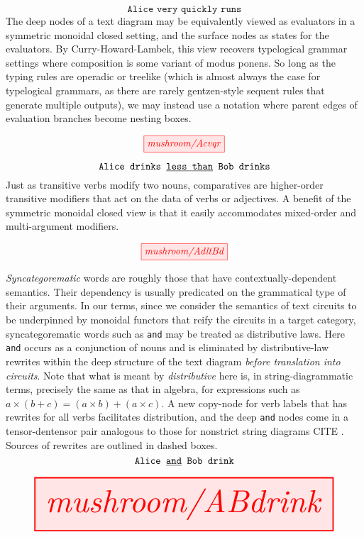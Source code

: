 \begin{myboxB}
\begin{example}\label{ex:intensifiers}
\[\texttt{Alice very quickly runs}\]
The deep nodes of a text diagram may be equivalently viewed as evaluators in a symmetric monoidal closed setting, and the surface nodes as states for the evaluators. By Curry-Howard-Lambek, this view recovers typelogical grammar settings where composition is some variant of modus ponens. So long as the typing rules are operadic or treelike (which is almost always the case for typelogical grammars, as there are rarely gentzen-style sequent rules that generate multiple outputs), we may instead use a notation where parent edges of evaluation branches become nesting boxes.
\end{example}
\[\tikzfig{mushroom/Acvqr}\]
\end{myboxB}

\begin{myboxB}
\begin{example}\label{ex:comparatives}
\[\texttt{Alice drinks \underline{less than} Bob drinks}\]
Just as transitive verbs modify two nouns, comparatives are higher-order transitive modifiers that act on the data of verbs or adjectives. A benefit of the symmetric monoidal closed view is that it easily accommodates mixed-order and multi-argument modifiers.
\end{example}
\[\tikzfig{mushroom/AdltBd}\]
\end{myboxB}

\begin{myboxR}
\begin{example}\label{ex:syncat1}
\emph{Syncategorematic} words are roughly those that have contextually-dependent semantics. Their dependency is usually predicated on the grammatical type of their arguments. In our terms, since we consider the semantics of text circuits to be underpinned by monoidal functors that reify the circuits in a target category, syncategorematic words such as \texttt{and} may be treated as distributive laws. Here \texttt{and} occurs as a conjunction of nouns and is eliminated by distributive-law rewrites within the deep structure of the text diagram \emph{before translation into circuits}. Note that what is meant by \emph{distributive} here is, in string-diagrammatic terms, precisely the same as that in algebra, for expressions such as $a \times (b + c) = (a \times b) + (a \times c)$. A new copy-node for verb labels that has rewrites for all verbs facilitates distribution, and the deep \texttt{and} nodes come in a tensor-dentensor pair analogous to those for nonstrict string diagrams \bR CITE \e. Sources of rewrites are outlined in dashed boxes.
\[\texttt{Alice \underline{and} Bob drink}\]
\end{example}
\[\resizebox{\textwidth}{!}{\tikzfig{mushroom/ABdrink}}\]
\end{myboxR}
\clearpage
\newpage



